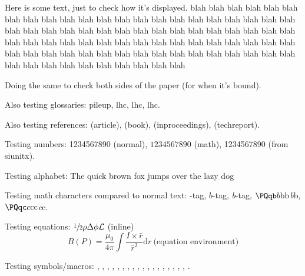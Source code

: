 Here is some text, just to check how it's displayed. blah blah blah blah blah blah blah blah blah blah blah blah blah blah blah blah blah blah blah blah blah blah blah blah blah blah blah blah blah blah blah blah blah blah blah blah blah blah blah blah blah blah blah blah blah blah blah blah blah blah blah blah blah blah blah blah blah blah blah blah blah blah blah blah blah blah blah blah blah blah blah blah blah blah blah blah blah blah blah blah 

\newpage

Doing the same to check both sides of the paper (for when it's bound).

Also testing glossaries: \gls{pileup}, \acrlong{lhc}, \acrshort{lhc}, \acrfull{lhc}.

Also testing references: \cite{CMS-PAPER-SUS-15-005-published} (article), \cite{tagkey1984quarksandleptons} (book), \cite{Lisanti:2016jxe} (inproceedings), \cite{CMS-PAS-HIG-18-008} (techreport).

Testing numbers: 1234567890 (normal), $1234567890$ (math), \si{1234567890} (from siunitx).

Testing alphabet: The quick brown fox jumps over the lazy dog

Testing math characters compared to normal text: \Pqb-tag, $b$-tag, \emph{b}-tag, $\Pqb b\mathrm{b}\text{b}$\emph{b}b, $\Pqc c\mathrm{c}\text{c}$\emph{c}c.

Testing equations: $\sfrac{1}{2} \rho \Delta \phi \mathcal{L}$ (inline)
\begin{equation}
B(P) = \frac{\mu_0}{4\pi} \int \frac{I \times \hat{r}}{\bar{r}^2}\mathrm{d}r \ \text{(equation environment)}
\end{equation}

Testing symbols/macros: \eV, \MeV, \GeV, \TeV, \pt, \ptmiss, \met, \HT, \mht, \mt, \aDark, \rinv, \mqdark, \doubleMuCr, \doubleLepMass, \alphat, \ttbarpjets, \wtolnupjets, \LSP.

